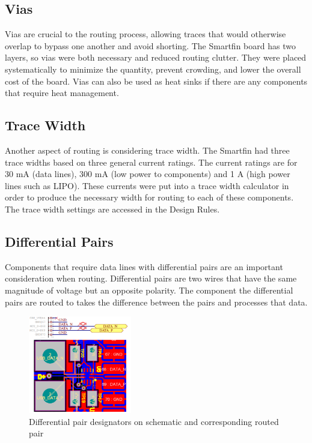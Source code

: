 \documentclass[twocolumn]{article}
\begin{document}
\subsection{Vias}
Vias are crucial to the routing process, allowing traces that would otherwise overlap to bypass one another and avoid shorting. The Smartfin board has two layers, so vias were both necessary and reduced routing clutter. They were placed systematically to minimize the quantity, prevent crowding, and lower the overall cost of the board. Vias can also be used as heat sinks if there are any components that require heat management.

\subsection{Trace Width}
Another aspect of routing is considering trace width. The Smartfin had three trace widths based on three general current ratings. The current ratings are for 30 mA (data lines), 300 mA (low power to components) and 1 A (high power lines such as LIPO). These currents were put into a trace width calculator in order to produce the necessary width for routing to each of these components. The trace width settings are accessed in the Design Rules.

\subsection{Differential Pairs}
Components that require data lines with differential pairs are an important consideration when routing. Differential pairs are two wires that have the same magnitude of voltage but an opposite polarity. The component the differential pairs are routed to takes the difference between the pairs and processes that data.

\begin{figure}[ht]
    \centering
    \includegraphics[width=0.4\textwidth]{differential pair.png}
    \caption{Differential pair designators on schematic and corresponding routed pair}
    \label{fig:differential-pair}
\end{figure}
\end{document}
